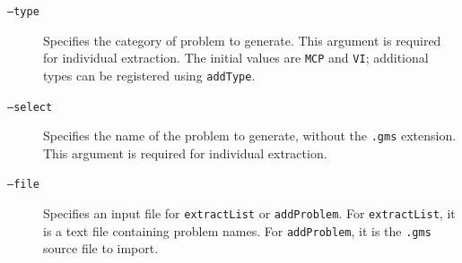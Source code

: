 \begin{description}
    \item[\texttt{--type}] Specifies the category of problem to generate. This argument is required for individual extraction. The initial values are \texttt{MCP} and \texttt{VI}; additional types can be registered using \texttt{addType}.

    \item[\texttt{--select}] Specifies the name of the problem to generate, without the \texttt{.gms} extension. This argument is required for individual extraction.

    \item[\texttt{--file}] Specifies an input file for \texttt{extractList} or \texttt{addProblem}. For \texttt{extractList}, it is a text file containing problem names. For \texttt{addProblem}, it is the \texttt{.gms} source file to import.
\end{description}
